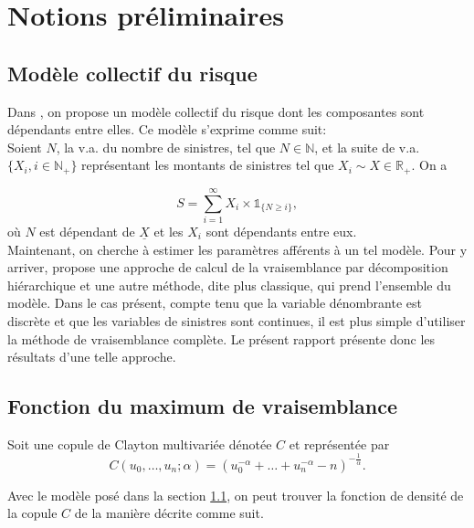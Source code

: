 \documentclass{article}
\begin{document}
	\section{Notions préliminaires}
	\subsection{Modèle collectif du risque}\label{sect_Modele_Collectif}
	
		Dans \cite{Itre5}, on propose un modèle collectif du risque dont les composantes sont dépendants entre elles. Ce modèle s'exprime comme suit: \\
		
		Soient $N$, la v.a. du nombre de sinistres, tel que $N \in \mathbb{N}$, et la suite de v.a. $\{X_i, i \in \mathbb{N_+}\}$ représentant les montants de sinistres tel que $X_i\sim X \in \mathbb{R}_+$. On a
		
		\begin{equation}\label{Modele_collectif}
			S = \sum_{i=1}^{\infty} X_i \times \mathds{1}_{\{N \geq i\}},
		\end{equation}
		où $N$ est dépendant de $\underline{X}$ et les $X_i$ sont dépendants entre eux. \\
		
		Maintenant, on cherche à estimer les paramètres afférents à un tel modèle. Pour y arriver, \cite{LikelyhoodEstimation} propose une approche de calcul de la vraisemblance par décomposition hiérarchique et une autre méthode, dite plus classique, qui prend l'ensemble du modèle. Dans le cas présent, compte tenu que la variable dénombrante est discrète et que les variables de sinistres sont continues, il est plus simple d'utiliser la méthode de vraisemblance complète. Le présent rapport présente donc les résultats d'une telle approche.
				
	
	\subsection{Fonction du maximum de vraisemblance} \label{sect_Maxlikelyhood}
	
		Soit une copule de Clayton multivariée dénotée $C$ et représentée par
		\begin{equation}\label{Copule_Clayton}
		C(u_0,\dots,u_n;\alpha) = (  u_0^{-\alpha} + \dots + u_n^{-\alpha} - n)^{-\frac{1}{\alpha}}.
		\end{equation}
	
		Avec le modèle posé dans la section \ref{sect_Modele_Collectif}, on peut trouver la fonction de densité de la copule $C$ de la manière décrite comme suit.\\
	
\end{document}
